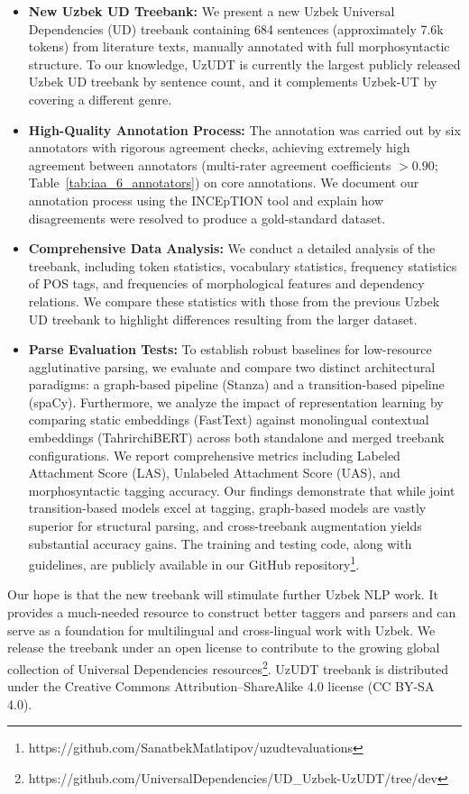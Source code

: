\documentclass[10pt, a4paper]{article}
\begin{document}
\begin{itemize}
    \item \textbf{New Uzbek UD Treebank:} We present a new Uzbek Universal Dependencies (UD) treebank containing 684 sentences (approximately 7.6k tokens) from literature texts, manually annotated with full morphosyntactic structure. To our knowledge, UzUDT is currently the largest publicly released Uzbek UD treebank by sentence count, and it complements Uzbek-UT by covering a different genre.
    
    \item \textbf{High-Quality Annotation Process:} The annotation was carried out by six annotators with rigorous agreement checks, achieving extremely high agreement between annotators (multi-rater agreement coefficients $>0.90$; Table~\ref{tab:iaa_6_annotators}) on core annotations. We document our annotation process using the INCEpTION tool\cite{klie-etal-2018-inception} and explain how disagreements were resolved to produce a gold-standard dataset.
    
    \item \textbf{Comprehensive Data Analysis:} We conduct a detailed analysis of the treebank, including token statistics, vocabulary statistics, frequency statistics of POS tags, and frequencies of morphological features and dependency relations. We compare these statistics with those from the previous Uzbek UD treebank to highlight differences resulting from the larger dataset.
    
    \item \textbf{Parse Evaluation Tests:} To establish robust baselines for low-resource agglutinative parsing, we evaluate and compare two distinct architectural paradigms: a graph-based pipeline (Stanza\cite{qi-etal-2020-stanza}) and a transition-based pipeline (spaCy\cite{Honnibal2017-lw}). Furthermore, we analyze the impact of representation learning by comparing static embeddings (FastText\cite{bojanowski-etal-2017-enriching}) against monolingual contextual embeddings (TahrirchiBERT) across both standalone and merged treebank configurations. We report comprehensive metrics including Labeled Attachment Score (LAS), Unlabeled Attachment Score (UAS), and morphosyntactic tagging accuracy. Our findings demonstrate that while joint transition-based models excel at tagging, graph-based models are vastly superior for structural parsing, and cross-treebank augmentation yields substantial accuracy gains. The training and testing code, along with guidelines, are publicly available in our GitHub repository\footnote{https://github.com/SanatbekMatlatipov/uzudtevaluations}.
\end{itemize}
Our hope is that the new treebank will stimulate further Uzbek NLP work. It provides a much-needed resource to construct better taggers and parsers and can serve as a foundation for multilingual and cross-lingual work with Uzbek. We release the treebank under an open license to contribute to the growing global collection of Universal Dependencies resources\footnote{https://github.com/UniversalDependencies/UD\_Uzbek-UzUDT/tree/dev}. UzUDT treebank is distributed under the Creative Commons Attribution–ShareAlike 4.0 license (CC BY-SA 4.0).
  
\end{document}

